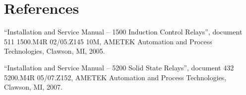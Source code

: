 \filbreak
\section*{References}


\noindent
``Installation and Service Manual -- 1500 Induction Control Relays'', document 511 1500.M4R 02/05.Z145 10M, AMETEK Automation and Process Technologies, Clawson, MI, 2005.

\vskip 10pt

\noindent
``Installation and Service Manual -- 5200 Solid State Relays'', document 432 5200.M4R 05/07.Z152, AMETEK Automation and Process Technologies, Clawson, MI, 2007.
















